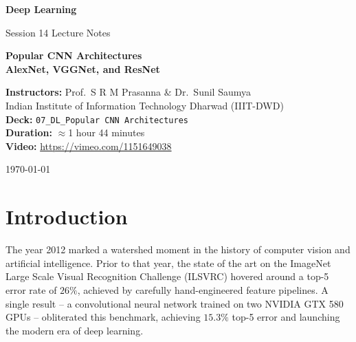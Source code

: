 \documentclass[12pt,a4paper]{article}
\begin{document}
\begin{titlepage}
  \centering
  \vspace*{2cm}
  {\LARGE\bfseries Deep Learning\par}
  \vspace{0.5cm}
  {\large Session 14 Lecture Notes\par}
  \vspace{1.5cm}
  {\huge\bfseries Popular CNN Architectures\\[0.4em]
   AlexNet, VGGNet, and ResNet\par}
  \vspace{1.5cm}
  {\large
    \textbf{Instructors:} Prof.\ S R M Prasanna \& Dr.\ Sunil Saumya\\[0.3em]
    Indian Institute of Information Technology Dharwad (IIIT-DWD)\\[0.3em]
    \textbf{Deck:} \texttt{07\_DL\_Popular CNN Architectures}\\[0.3em]
    \textbf{Duration:} $\approx$1 hour 44 minutes\\[0.3em]
    \textbf{Video:} \url{https://vimeo.com/1151649038}
  }
  \vfill
  {\large\today\par}
\end{titlepage}


\newpage

\section{Introduction}
\label{sec:intro}

The year 2012 marked a watershed moment in the history of computer vision and artificial intelligence. Prior to that year, the state of the art on the ImageNet Large Scale Visual Recognition Challenge (ILSVRC) hovered around a top-5 error rate of $26\%$, achieved by carefully hand-engineered feature pipelines. A single result -- a convolutional neural network trained on two NVIDIA GTX 580 GPUs -- obliterated this benchmark, achieving $15.3\%$ top-5 error and launching the modern era of deep learning.
\end{document}
